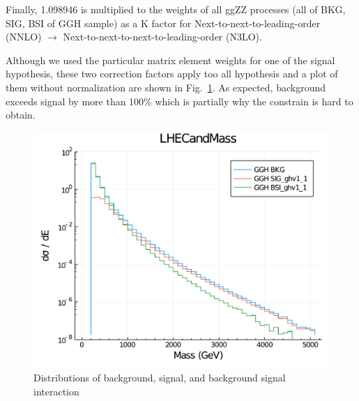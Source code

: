 Finally, 1.098946 is multiplied to the weights of all ggZZ processes (all of BKG, SIG, BSI
of GGH sample) as a K factor for Next-to-next-to-leading-order (NNLO) $\rightarrow$ 
Next-to-next-to-next-to-leading-order (N3LO).

Although we used the particular matrix element weights for one of the signal hypothesis, these two
correction factors apply too all hypothesis and a plot of them without normalization are shown
in Fig.~\ref{fig:bsi_sig_bkg_compare}. As expected, background exceeds signal by more than 100\%
which is partially why the constrain is hard to obtain.
\begin{figure}[htb]
    \begin{center}
        \includegraphics[width=.7\linewidth]{fig/LHE_integral_difference.pdf}
    \end{center}
    \caption{Distributions of background, signal, and background signal interaction}
    \label{fig:bsi_sig_bkg_compare}
\end{figure}

